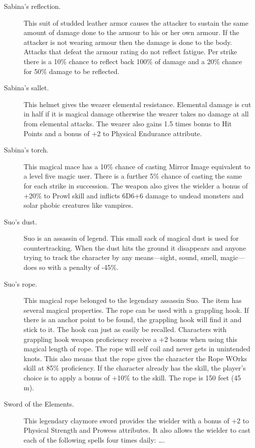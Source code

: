 \begin{description}
\item[Sabina's reflection.]
This suit of studded leather armor causes the
attacker to sustain the same amount of damage
done to the armour to his or her own armour.
If the attacker is not wearing armour then the damage
is done to the body.
Attacks that defeat the armour rating do not
reflect fatigue.
Per strike there is a 10\% chance to reflect back 100\% of damage
and a 20\% chance for 50\% damage to be reflected.

\item[Sabina's sallet.]
This helmet gives the wearer elemental resistance.
Elemental damage is cut in half if it is magical damage
otherwise the wearer takes no damage at all from
elemental attacks.
The wearer also gains 1.5 times bonus to Hit Points and
a bonus of +2 to Physical Endurance attribute.

\item[Sabina's torch.]
This magical mace has a 10\% chance of casting
Mirror Image equivalent to a level five magic user.
There is a further 5\% chance of casting the same
for each strike in succession.
The weapon also gives the wielder a bonus of +20\%
to Prowl skill and inflicts 6D6+6 damage to undead
monsters and solar phobic creatures like vampires.

\item[Suo's dust.] Suo is an assassin of legend.
This small sack of magical dust is used for
countertracking.
When the dust hits the ground it disappears and
anyone trying to track the character by any
means---sight, sound, smell, magic---does so with
a penalty of -45\%.

\item[Suo's rope.] This magical rope belonged to the
legendary assassin Suo.
The item has several magical properties.
The rope can be used with a grappling hook.
If there is an anchor point to be found,
the grappling hook will find it and stick to it.
The hook can just as easily be recalled.
Characters with grappling hook weapon proficiency
receive a +2 bonus when using this magical length
of rope.
The rope will self coil and never gets in
unintended knots.
This also means that the rope gives the character
the Rope WOrks skill at 85\% proficiency.
If the character already has the skill, the player's
choice is to apply a bonus of +10\% to the skill.
The rope is 150 feet (45 m).

\item[Sword of the Elements.]
This legendary claymore sword provides the wielder with
a
bonus of +2 to Physical Strength and Prowess attributes.
It also allows the wielder to cast each of the following
spells four times daily: \ldots{}.


\end{description}
